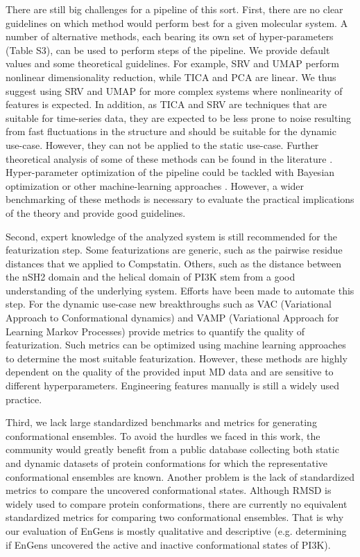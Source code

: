 \documentclass[numsec,webpdf,contemporary,large]{oup-authoring-template}
\theoremstyle{thmstyleone}%
\theoremstyle{thmstyletwo}%
\theoremstyle{thmstylethree}%
\begin{document}
There are still big challenges for a pipeline of this sort. First, there are no clear guidelines on which method would perform best for a given molecular system. A number of alternative methods, each bearing its own set of hyper-parameters (Table S3), can be used to perform steps of the pipeline. We provide default values and some theoretical guidelines. For example, SRV and  UMAP perform nonlinear dimensionality reduction, while TICA and PCA are linear. We thus suggest using SRV and UMAP for more complex systems where nonlinearity of features is expected. In addition, as TICA and SRV are techniques that are suitable for time-series data, they are expected to be less prone to noise resulting from fast fluctuations in the structure and should be suitable for the dynamic use-case. However, they can not be applied to the static use-case. Further theoretical analysis of some of these methods can be found in the literature \citep{glielmo_unsupervised_2021}. Hyper-parameter optimization of the pipeline could be tackled with Bayesian optimization or other machine-learning approaches \citep{lee_adaptive_2022}. However, a wider benchmarking of these  methods is necessary to evaluate the practical implications of the theory and provide good guidelines.

Second, expert knowledge of the analyzed system is still recommended for the featurization step. Some featurizations are generic, such as the pairwise residue distances that we applied to Compstatin. Others, such as the distance between the nSH2 domain and the helical domain of PI3K stem from a good understanding of the underlying system. Efforts have been made to automate this step. For the dynamic use-case new breakthroughs such as VAC (Variational Approach to Conformational dynamics) \citep{wu_variational_2020, lorpaiboon_integrated_2020} and VAMP (Variational Approach for Learning Markov Processes) \citep{wu_variational_2020} provide metrics to quantify the quality of featurization. Such metrics can be optimized using machine learning approaches to determine the most suitable featurization. However, these methods are highly dependent on the quality of the provided input MD data and are sensitive to different hyperparameters. Engineering features manually is still a widely used practice. 

Third, we lack large standardized benchmarks and metrics for generating conformational ensembles. To avoid the hurdles we faced in this work, the community would greatly benefit from a public database collecting both static and dynamic datasets of protein conformations for which the representative conformational ensembles are known.  Another problem is the lack of standardized metrics to compare the uncovered conformational states. Although RMSD is widely used to compare protein conformations, there are currently no equivalent standardized metrics for comparing two conformational ensembles. That is why our evaluation of EnGens is mostly qualitative and descriptive (e.g. determining if EnGens uncovered the active and inactive conformational states of PI3K). 
\end{document}
